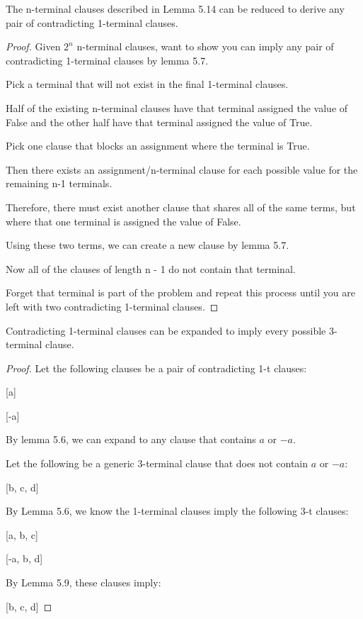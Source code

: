 \documentclass[manuscript]{acmart}
\begin{document}
    \begin{lemma}
        The n-terminal clauses described in Lemma 5.14 can be reduced to derive
        any pair of contradicting 1-terminal clauses.
    \end{lemma}
    \begin{proof}
        Given $2^n$ n-terminal clauses, want to show you can imply any pair
        of contradicting 1-terminal clauses by lemma 5.7.

        Pick a terminal that will not exist in the final 1-terminal clauses.

        Half of the existing n-terminal clauses have that terminal assigned
        the value of False and the other half have that terminal assigned
        the value of True.

        Pick one clause that blocks an assignment where the terminal is True.

        Then there exists an assignment/n-terminal clause for each possible
        value for the remaining n-1 terminals.

        Therefore, there must exist another clause that shares all of the same terms, but
        where that one terminal is assigned the value of False.

        Using these two terms, we can create a new clause by lemma 5.7.

        Now all of the clauses of length n - 1 do not contain that terminal.

        Forget that terminal is part of the problem and repeat this process
        until you are left with two contradicting 1-terminal clauses.
    \end{proof}

    \begin{lemma}
        Contradicting 1-terminal clauses can be expanded to imply
        every possible 3-terminal clause.
    \end{lemma}
    \begin{proof}
        Let the following clauses be a pair of contradicting 1-t clauses:

        [a]

        [-a]

        By lemma 5.6, we can expand to any clause that contains $a$ or $-a$.

        Let the following be a generic 3-terminal clause that does not contain
        $a$ or $-a$:

        [b, c, d]

        By Lemma 5.6, we know the 1-terminal clauses imply the following 3-t clauses:

        [a, b, c]

        [-a, b, d]

        By Lemma 5.9, these clauses imply:

        [b, c, d]
    \end{proof}
\end{document}
